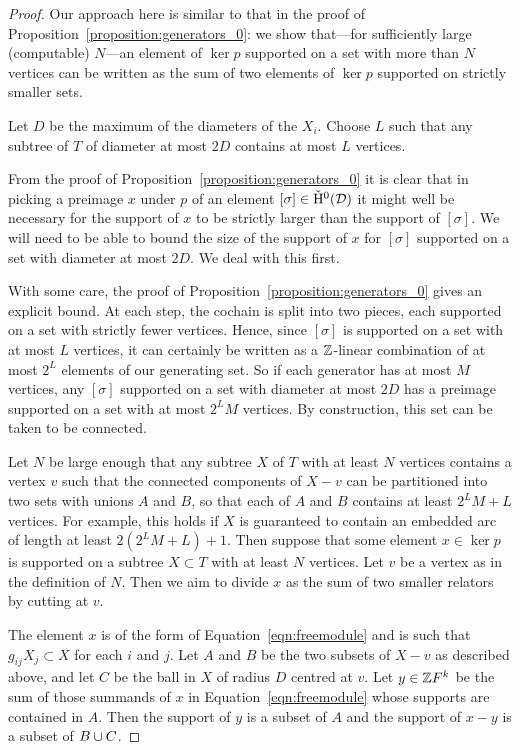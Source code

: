 \begin{proof}
Our approach here is similar to that in the proof of Proposition~\ref{proposition:generators_0}: we show that---for sufficiently large (computable) $N$---an element of $\ker p$ supported on a set with more than $N$ vertices can be written as the sum of two elements of $\ker p$ supported on strictly smaller sets.

Let $D$ be the maximum of the diameters of the $X_i$.
Choose $L$ such that any subtree of $T$ of diameter at most $2D$ contains at most $L$ vertices.

From the proof of Proposition~\ref{proposition:generators_0} it is clear that in picking a preimage $x$ under $p$ of an element $[\sigma] \in \check{\mathrm{H}}{}^0( \mathcal{D})$ it might well be necessary for the support of $x$ to be strictly larger than the support of $[\sigma]$.
We will need to be able to bound the size of the support of $x$ for $[\sigma]$ supported on a set with diameter at most $2D$.
We deal with this first.

With some care, the proof of Proposition~\ref{proposition:generators_0} gives an explicit bound.
At each step, the cochain is split into two pieces, each supported on a set with strictly fewer vertices.
Hence, since $[\sigma]$ is supported on a set with at most $L$ vertices, it can certainly be written as a $\mathbb{Z}$-linear combination of at most $2^L$ elements of our generating set.
So if each generator has at most $M$ vertices, any $[\sigma]$ supported on a set with diameter at most $2D$ has a preimage supported on a set with at most $2^L M$ vertices.
By construction, this set can be taken to be connected.

Let $N$ be large enough that any subtree $X$ of $T$ with at least $N$ vertices contains a vertex $v$ such that the connected components of $X - v$ can be partitioned into two sets with unions $A$ and $B$, so that each of $A$ and $B$ contains at least $2^LM+L$ vertices.
For example, this holds if $X$ is guaranteed to contain an embedded arc of length at least $2(2^LM+L) +1$.
Then suppose that some element $x \in \ker p$ is supported on a subtree $X \subset T$ with at least $N$ vertices.
Let $v$ be a vertex as in the definition of $N$.
Then we aim to divide $x$ as the sum of two smaller relators by cutting at $v$.

The element $x$ is of the form of Equation~\ref{eqn:freemodule} and is such that $g_{ij}X_j \subset X$ for each $i$ and $j$.
Let $A$ and $B$ be the two subsets of $X - v$ as described above, and let $C$ be the ball in $X$ of radius $D$ centred at $v$.
Let $y \in \mathbb{Z} F^k$ be the sum of those summands of $x$ in Equation~\ref{eqn:freemodule} whose supports are contained in $A$.
Then the support of $y$ is a subset of $A$ and the support of $x-y$ is a subset of $B \cup C$.


\end{proof}

